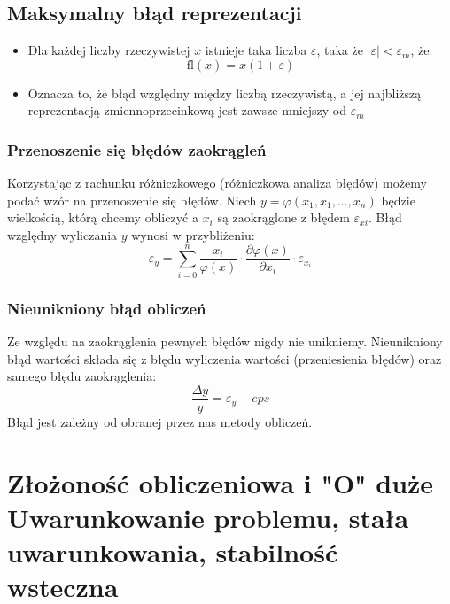 \documentclass[a4paper]{article}
\begin{document}
\subsection{Maksymalny błąd reprezentacji}
\begin{itemize}
    \item Dla każdej liczby rzeczywistej $x$ istnieje taka liczba $\varepsilon$, taka że $|\varepsilon|<\varepsilon_m$, że:
    \begin{equation*}
        \mathrm{fl}(x)=x(1+\varepsilon)
    \end{equation*}
    \item Oznacza to, że błąd względny między liczbą rzeczywistą, a jej najbliższą reprezentacją zmiennoprzecinkową jest zawsze mniejszy od $\varepsilon_m$
\end{itemize}

\subsubsection{Przenoszenie się błędów zaokrągleń}
Korzystając z rachunku różniczkowego (różniczkowa analiza błędów) możemy podać wzór na przenoszenie się błędów. Niech $y=\varphi(x_1,x_1,\dots,x_n)$ będzie wielkością, którą chcemy obliczyć a $x_i$ są zaokrąglone z błędem $\varepsilon_{xi}$. Błąd względny wyliczania $y$ wynosi w przybliżeniu:
\begin{equation*}
    \varepsilon_y = \sum_{i=0}^n \frac{x_i}{\varphi(x)} \cdot \frac{\partial\varphi(x)}{\partial x_i} \cdot \varepsilon_{x_i}
\end{equation*}

\subsubsection{Nieunikniony błąd obliczeń}
Ze względu na zaokrąglenia pewnych błędów nigdy nie unikniemy. Nieunikniony błąd wartości składa się z błędu wyliczenia wartości (przeniesienia błędów) oraz samego błędu zaokrąglenia:
\begin{equation*}
    \frac{\Delta y}{y} = \varepsilon_y + eps
\end{equation*}
Błąd jest zależny od obranej przez nas metody obliczeń.

\section{Złożoność obliczeniowa i "O" duże Uwarunkowanie problemu, stała uwarunkowania, stabilność wsteczna}
\end{document}
